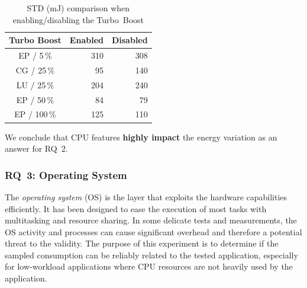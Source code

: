 \begin{table}%
    \centering
    \caption{STD (mJ) comparison when enabling/disabling the Turbo~Boost}
    \label{table:turboboost}
    \small
    \begin{tabular}{|c|r|r|}
        \hline
        \textbf{Turbo Boost}  & \textbf{Enabled} & \textbf{Disabled} \\
        \hline
        \hline
        \textsf{EP} / 5\,\%   & 310              & 308               \\
        \hline
        \textsf{CG} / 25\,\%  & 95               & 140               \\
        \hline
        \textsf{LU} / 25\,\%  & 204              & 240               \\
        \hline
        \textsf{EP} / 50\,\%  & 84               & 79                \\
        \hline
        \textsf{EP} / 100\,\% & 125              & 110               \\
        \hline
    \end{tabular}
\end{table}


\begin{mdframed}[skipabove=\topsep,skipbelow=\topsep]
    We conclude that CPU features \textbf{highly impact} the energy variation as an answer for \textsc{RQ~2}.
\end{mdframed}

\subsubsection{\textsc{RQ}~3: Operating System}
The \emph{operating system} (OS) is the layer that exploits the hardware capabilities efficiently.
It has been designed to ease the execution of most tasks with multitasking and resource sharing.
In some delicate tests and measurements, the OS activity and processes can cause significant overhead and therefore a potential threat to the validity. %
The purpose of this experiment is to determine if the sampled consumption can be reliably related to the tested application, especially for low-workload applications where CPU resources are not heavily used by the application.

